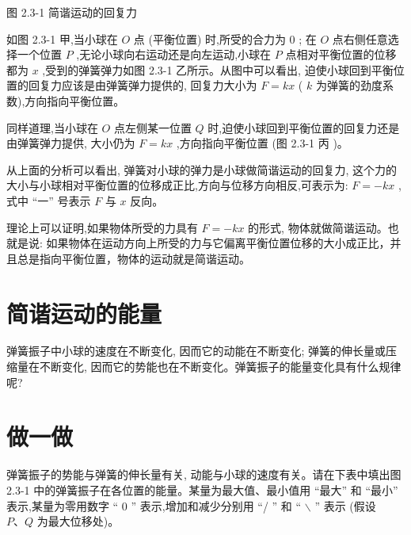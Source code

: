 \documentclass[10pt]{article}
\begin{document}
图 2.3-1 简谐运动的回复力

如图 2.3-1 甲,当小球在 \(O\) 点 (平衡位置) 时,所受的合力为 0 ; 在 \(O\) 点右侧任意选择一个位置 \(P\) ,无论小球向右运动还是向左运动,小球在 \(P\) 点相对平衡位置的位移都为 \(x\) ,受到的弹簧弹力如图 2.3-1 乙所示。从图中可以看出, 迫使小球回到平衡位置的回复力应该是由弹簧弹力提供的, 回复力大小为 \(F = {kx}\) ( \(k\) 为弹簧的劲度系数),方向指向平衡位置。

同样道理,当小球在 \(O\) 点左侧某一位置 \(Q\) 时,迫使小球回到平衡位置的回复力还是由弹簧弹力提供, 大小仍为 \(F = {kx}\) ,方向指向平衡位置 (图 2.3-1 丙 )。

从上面的分析可以看出, 弹簧对小球的弹力是小球做简谐运动的回复力, 这个力的大小与小球相对平衡位置的位移成正比,方向与位移方向相反,可表示为: \(F = - {kx}\) , 式中 “一” 号表示 \(F\) 与 \(x\) 反向。

理论上可以证明,如果物体所受的力具有 \(F = - {kx}\) 的形式, 物体就做简谐运动。也就是说: 如果物体在运动方向上所受的力与它偏离平衡位置位移的大小成正比，并且总是指向平衡位置，物体的运动就是简谐运动。

\section*{简谐运动的能量}

弹簧振子中小球的速度在不断变化, 因而它的动能在不断变化; 弹簧的伸长量或压缩量在不断变化, 因而它的势能也在不断变化。弹簧振子的能量变化具有什么规律呢?

\section*{做一做}

弹簧振子的势能与弹簧的伸长量有关, 动能与小球的速度有关。请在下表中填出图 2.3-1 中的弹簧振子在各位置的能量。某量为最大值、最小值用 “最大” 和 “最小” 表示,某量为零用数字 “ 0 ” 表示,增加和减少分别用 “/ ” 和 “ \(\smallsetminus\) ” 表示 (假设 \(P\text{、}Q\) 为最大位移处)。

\begin{center}
\end{center}
\end{document}
